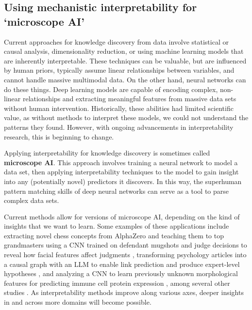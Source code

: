 \subsection{Using mechanistic interpretability for `microscope AI'}
\label{subsec:microscope-ai}

Current approaches for knowledge discovery from data involve statistical or causal analysis, dimensionality reduction, or using machine learning models that are inherently interpretable. These techniques can be valuable, but are influenced by human priors, typically assume linear relationships between variables, and cannot handle massive multimodal data. On the other hand, neural networks can do these things. Deep learning models are capable of encoding complex, non-linear relationships and extracting meaningful features from massive data sets without human intervention. Historically, these abilities had limited scientific value, as without methods to interpret these models, we could not understand the patterns they found. However, with ongoing advancements in interpretability research, this is beginning to change.

Applying interpretability for knowledge discovery is sometimes called \textbf{microscope AI}. This approach involves training a neural network to model a data set, then applying interpretability techniques to the model to gain insight into any (potentially novel) predictors it discovers. In this way, the superhuman pattern matching skills of deep neural networks can serve as a tool to parse complex data sets.

Current methods allow for versions of microscope AI, depending on the kind of insights that we want to learn. Some examples of these applications include extracting novel chess concepts from AlphaZero and teaching them to top grandmasters \citep{schut2023bridginghumanaiknowledgegap} using a CNN trained on defendant mugshots and judge decisions to reveal how facial features affect judgments \citep{Ludwig_2023}, transforming psychology articles into a causal graph with an LLM to enable link prediction and produce expert-level hypotheses \citep{tong2024automating}, and analyzing a CNN to learn previously unknown morphological features for predicting immune cell protein expression \citep{cooper2022lymphocyte}, among several other studies \citep{obrien2023machine,hicks2021explaining,Narayanaswamy_2020,korot2021predicting}. As interpretability methods improve along various axes, deeper insights in and across more domains will become possible.

